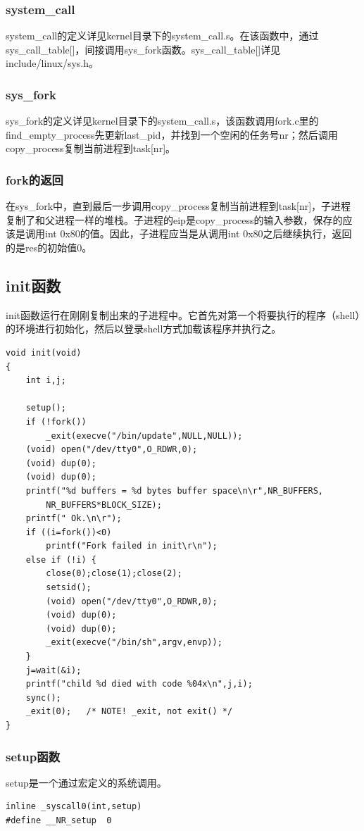 \documentclass[12pt]{article}
\begin{document}
\subsubsection{system\_call}
system\_call的定义详见kernel目录下的system\_call.s。在该函数中，通过sys\_call\_table[]，间接调用sys\_fork函数。sys\_call\_table[]详见include/linux/sys.h。
\subsubsection{sys\_fork}
sys\_fork的定义详见kernel目录下的system\_call.s，该函数调用fork.c里的find\_empty\_process先更新last\_pid，并找到一个空闲的任务号nr；然后调用copy\_process复制当前进程到task[nr]。
\subsubsection{fork的返回}
在sys\_fork中，直到最后一步调用copy\_process复制当前进程到task[nr]，子进程复制了和父进程一样的堆栈。子进程的eip是copy\_process的输入参数，保存的应该是调用int 0x80的值。因此，子进程应当是从调用int 0x80之后继续执行，返回的是res的初始值0。
\subsection{init函数}	
init函数运行在刚刚复制出来的子进程中。它首先对第一个将要执行的程序（shell）的环境进行初始化，然后以登录shell方式加载该程序并执行之。
\begin{lstlisting}[breaklines]
void init(void)
{
	int i,j;

	setup();
	if (!fork())
		_exit(execve("/bin/update",NULL,NULL));
	(void) open("/dev/tty0",O_RDWR,0);
	(void) dup(0);
	(void) dup(0);
	printf("%d buffers = %d bytes buffer space\n\r",NR_BUFFERS,
		NR_BUFFERS*BLOCK_SIZE);
	printf(" Ok.\n\r");
	if ((i=fork())<0)
		printf("Fork failed in init\r\n");
	else if (!i) {
		close(0);close(1);close(2);
		setsid();
		(void) open("/dev/tty0",O_RDWR,0);
		(void) dup(0);
		(void) dup(0);
		_exit(execve("/bin/sh",argv,envp));
	}
	j=wait(&i);
	printf("child %d died with code %04x\n",j,i);
	sync();
	_exit(0);	/* NOTE! _exit, not exit() */
}
\end{lstlisting}
\subsubsection{setup函数}	
setup是一个通过宏定义的系统调用。
\begin{lstlisting}[breaklines]
inline _syscall0(int,setup)
#define __NR_setup	0
\end{lstlisting}
\end{document}
